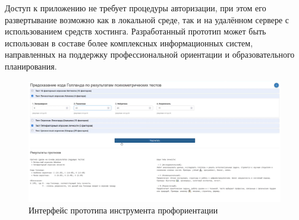 Доступ к приложению не требует процедуры авторизации, при этом его развертывание возможно как в локальной среде, так и на удалённом сервере с использованием средств хостинга. Разработанный прототип может быть использован в составе более комплексных информационных систем, направленных на поддержку профессиональной ориентации и образовательного планирования.

\begin{figure}[htbp]
    \centering
    \includegraphics[width=1.0\linewidth]{figures/UI1.png}
    \caption{Интерфейс прототипа инструмента профориентации}
    \label{fig:ui}
\end{figure}
